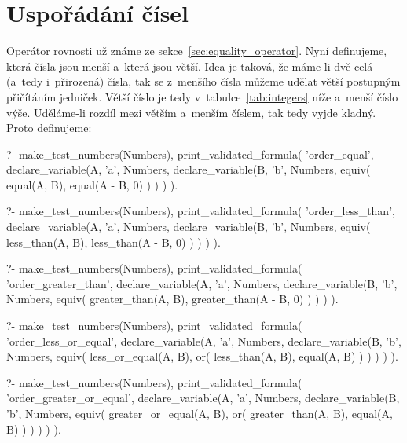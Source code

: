 \section{Uspořádání čísel}

Operátor rovnosti už známe ze sekce~\ref{sec:equality_operator}. Nyní definujeme, která čísla jsou menší a~která jsou větší. Idea je taková, že máme-li dvě celá (a~tedy i~přirozená) čísla, tak se z~menšího čísla můžeme udělat větší postupným přičítáním jedniček. Větší číslo je tedy v~tabulce~\ref{tab:integers} níže a~menší číslo výše. Uděláme-li rozdíl mezi větším a~menším číslem, tak tedy vyjde kladný. Proto definujeme:

\begin{fact}
\begin{prolog}
?-	make_test_numbers(Numbers),
	print_validated_formula(
		'order_equal',
		declare_variable(A, 'a', Numbers,
			declare_variable(B, 'b', Numbers,
				equiv(
					equal(A, B),
					equal(A - B, 0)
				)
			)
		)
	).
\end{prolog}
\begin{prolog}
?-	make_test_numbers(Numbers),
	print_validated_formula(
		'order_less_than',
		declare_variable(A, 'a', Numbers,
			declare_variable(B, 'b', Numbers,
				equiv(
					less_than(A, B),
					less_than(A - B, 0)
				)
			)
		)
	).
\end{prolog}
\begin{prolog}
?-	make_test_numbers(Numbers),
	print_validated_formula(
		'order_greater_than',
		declare_variable(A, 'a', Numbers,
			declare_variable(B, 'b', Numbers,
				equiv(
					greater_than(A, B),
					greater_than(A - B, 0)
				)
			)
		)
	).
\end{prolog}
\begin{prolog}
?-	make_test_numbers(Numbers),
	print_validated_formula(
		'order_less_or_equal',
		declare_variable(A, 'a', Numbers,
			declare_variable(B, 'b', Numbers,
				equiv(
					less_or_equal(A, B),
					or(
						less_than(A, B),
						equal(A, B)
					)
				)
			)
		)
	).
\end{prolog}
\begin{prolog}
?-	make_test_numbers(Numbers),
	print_validated_formula(
		'order_greater_or_equal',
		declare_variable(A, 'a', Numbers,
			declare_variable(B, 'b', Numbers,
				equiv(
					greater_or_equal(A, B),
					or(
						greater_than(A, B),
						equal(A, B)
					)
				)
			)
		)
	).
\end{prolog}
\end{fact}

